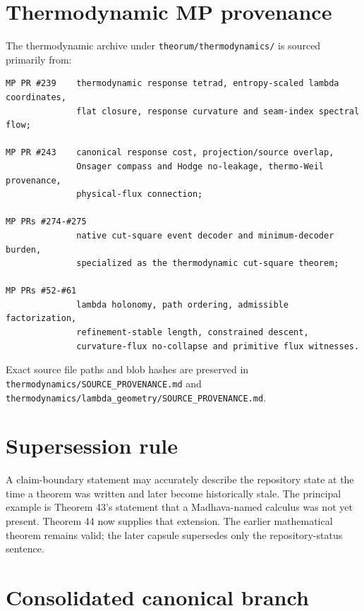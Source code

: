 \hypertarget{thermodynamic-mp-provenance}{%
\section{Thermodynamic MP provenance}\label{thermodynamic-mp-provenance}}

The thermodynamic archive under \texttt{theorum/thermodynamics/} is sourced primarily from:

\begin{verbatim}
MP PR #239    thermodynamic response tetrad, entropy-scaled lambda coordinates,
              flat closure, response curvature and seam-index spectral flow;

MP PR #243    canonical response cost, projection/source overlap,
              Onsager compass and Hodge no-leakage, thermo-Weil provenance,
              physical-flux connection;

MP PRs #274-#275
              native cut-square event decoder and minimum-decoder burden,
              specialized as the thermodynamic cut-square theorem;

MP PRs #52-#61
              lambda holonomy, path ordering, admissible factorization,
              refinement-stable length, constrained descent,
              curvature-flux no-collapse and primitive flux witnesses.
\end{verbatim}

Exact source file paths and blob hashes are preserved in \texttt{thermodynamics/SOURCE\_PROVENANCE.md} and \texttt{thermodynamics/lambda\_geometry/SOURCE\_PROVENANCE.md}.

\hypertarget{supersession-rule}{%
\section{Supersession rule}\label{supersession-rule}}

A claim-boundary statement may accurately describe the repository state at the time a theorem was written and later become historically stale. The principal example is Theorem 43's statement that a Madhava-named calculus was not yet present. Theorem 44 now supplies that extension. The earlier mathematical theorem remains valid; the later capsule supersedes only the repository-status sentence.

\hypertarget{consolidated-canonical-branch}{%
\section{Consolidated canonical branch}\label{consolidated-canonical-branch}}

